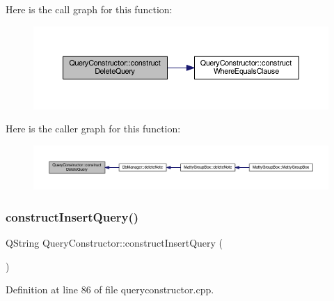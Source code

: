 Here is the call graph for this function\+:
\nopagebreak
\begin{figure}[H]
\begin{center}
\leavevmode
\includegraphics[width=350pt]{classQueryConstructor_a1585447293c477d7c5bebf4049cbbc07_cgraph}
\end{center}
\end{figure}
Here is the caller graph for this function\+:
\nopagebreak
\begin{figure}[H]
\begin{center}
\leavevmode
\includegraphics[width=350pt]{classQueryConstructor_a1585447293c477d7c5bebf4049cbbc07_icgraph}
\end{center}
\end{figure}
\hypertarget{classQueryConstructor_a707ac10b6fd4dfa235e2310b0259ea8e}{}\label{classQueryConstructor_a707ac10b6fd4dfa235e2310b0259ea8e} 
\subsubsection{\texorpdfstring{construct\+Insert\+Query()}{constructInsertQuery()}}
{\footnotesize\ttfamily Q\+String Query\+Constructor\+::construct\+Insert\+Query (\begin{DoxyParamCaption}{ }\end{DoxyParamCaption})}



Definition at line 86 of file queryconstructor.\+cpp.

\hypertarget{classQueryConstructor_ae832ca3bc59df18cb8ef08fc1d9fd75f}{}\label{classQueryConstructor_ae832ca3bc59df18cb8ef08fc1d9fd75f} 
